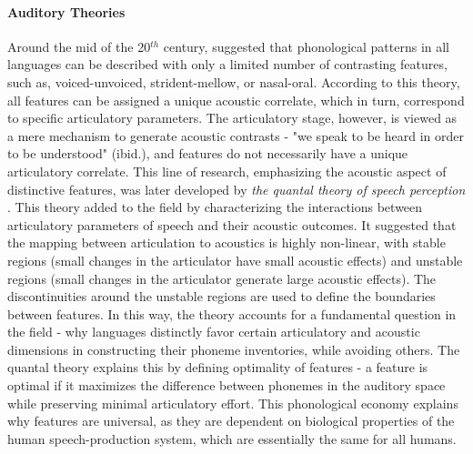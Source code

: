 \paragraph{Auditory Theories}
Around the mid of the 20$^{th}$ century, \citet{jakobson1951preliminaries} suggested that phonological patterns in all languages can be described with only a limited number of contrasting features, such as, voiced-unvoiced, strident-mellow, or nasal-oral. According to this theory, all features can be assigned a unique acoustic correlate, which in turn, correspond to specific articulatory parameters. The articulatory stage, however, is viewed as a mere mechanism to generate acoustic contrasts - "we speak to be heard in order to be understood" (ibid.), and features do not necessarily have a unique articulatory correlate. This line of research, emphasizing the acoustic aspect of distinctive features, was later developed by \textit{the quantal theory of speech perception} \citep{stevens1972quantal,stevens1989quantal}. This theory added to the field by characterizing the interactions between articulatory parameters of speech and their acoustic outcomes. It suggested that the mapping between articulation to acoustics is highly non-linear, with stable regions (small changes in the articulator have small acoustic effects) and unstable regions (small changes in the articulator generate large acoustic effects). The discontinuities around the unstable regions are used to define the boundaries between features. In this way, the theory accounts for a fundamental question in the field - why languages distinctly favor certain articulatory and acoustic dimensions in constructing their phoneme inventories, while avoiding others. The quantal theory explains this by defining optimality of features - a feature is optimal if it maximizes the difference between phonemes in the auditory space while preserving minimal articulatory effort. This phonological economy explains why features are universal, as they are dependent on biological properties of the human speech-production system, which are essentially the same for all humans.

